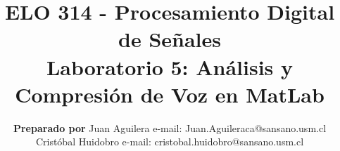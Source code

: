 \documentclass[letterpaper,onecolumn,10pt,journal,final]{IEEEtran}
\begin{document}
\title{ELO 314 - Procesamiento Digital de Señales\\ Laboratorio 5: Análisis y Compresión de Voz en MatLab}

\author{\textbf{Preparado por}
\vspace{1 mm}Juan Aguilera e-mail: Juan.Aguileraca@sansano.usm.cl \\
            Cristóbal Huidobro e-mail: 
cristobal.huidobro@sansano.usm.cl}

\maketitle

\vspace{-1 cm}

%
%
\end{document}

